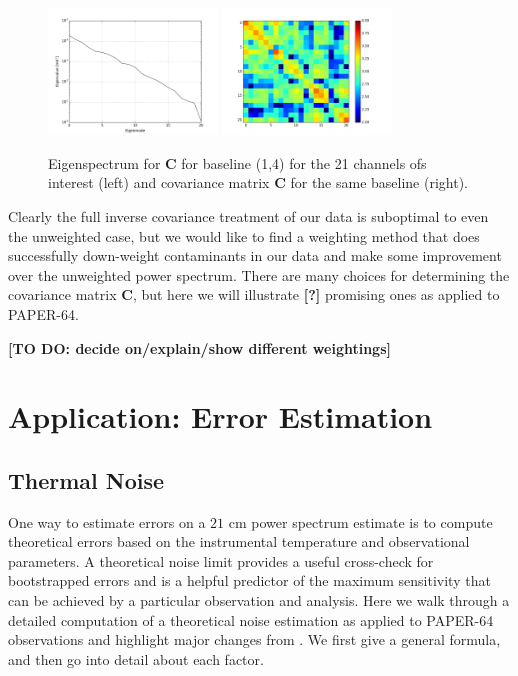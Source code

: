 \documentclass[preprint2,numberedappendix,tighten,twocolappendix]{aastex6}  %
\newcommand{\cc}[1]{{\color{purple} \textbf{[#1]}}}
\begin{document}
\begin{figure}
	\centering
	\includegraphics[width=0.4\textwidth]{plots/eigenspectrum.png}
	\includegraphics[width=0.4\textwidth]{plots/covariance.png}
	\caption{Eigenspectrum for $\textbf{C}$ for baseline (1,4) for the 21 channels ofs interest (left) and covariance matrix $\textbf{C}$ for the same baseline (right).}
	\label{fig:eigenspectrum}
\end{figure}

Clearly the full inverse covariance treatment of our data is suboptimal to even the unweighted case, but we would like to find a weighting method that does successfully down-weight contaminants in our data and make some improvement over the unweighted power spectrum. There are many choices for determining the covariance matrix $\textbf{C}$, but here we will illustrate \cc{?} promising ones as applied to PAPER-64.

\cc{TO DO: decide on/explain/show different weightings}

\section{Application: Error Estimation}
\label{sec:Error}

\subsection{Thermal Noise}
\label{sec:PSSense}

One way to estimate errors on a $21$ cm power spectrum estimate is to compute theoretical errors based on the instrumental temperature and observational parameters. A theoretical noise limit provides a useful cross-check for bootstrapped errors and is a helpful predictor of the maximum sensitivity that can be achieved by a particular observation and analysis. Here we walk through a detailed computation of a theoretical noise estimation as applied to PAPER-64 observations and highlight major changes from \citet{ali_et_al2015}. We first give a general formula, and then go into detail about each factor.
\end{document}
